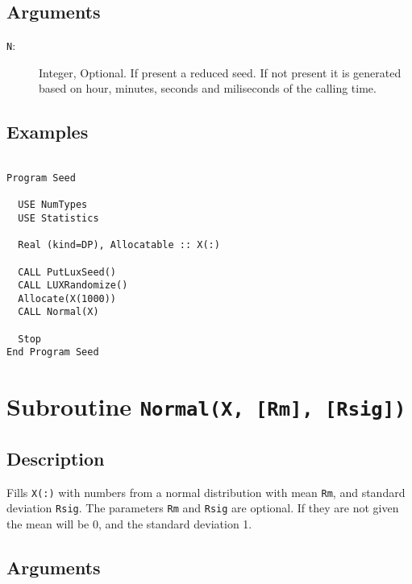 \subsection{Arguments}

\begin{description}
\item[\texttt{N}:] Integer, Optional. If present a reduced seed. If
  not present it is generated based on hour, minutes, seconds and
  miliseconds of the calling time.
\end{description}

\subsection{Examples}

\begin{lstlisting}[emph=LUXRandomize,
                   emphstyle=\color{blue},
                   frame=trBL,
                   caption=Randomizing the LUX generator., 
                   label=luxrandomize]

Program Seed

  USE NumTypes
  USE Statistics

  Real (kind=DP), Allocatable :: X(:)

  CALL PutLuxSeed()
  CALL LUXRandomize()
  Allocate(X(1000))
  CALL Normal(X)

  Stop
End Program Seed
\end{lstlisting}


\section{Subroutine \texttt{Normal(X, [Rm], [Rsig])}}

\subsection{Description}

Fills \texttt{X(:)} with numbers from a normal distribution with mean
\texttt{Rm}, and standard deviation \texttt{Rsig}. The parameters
\texttt{Rm} and \texttt{Rsig} are optional. If they are not given the
mean will be 0, and the standard deviation 1.

\subsection{Arguments}

